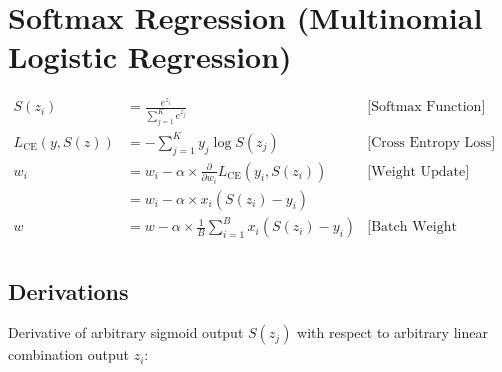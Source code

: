 \section{Softmax Regression (Multinomial Logistic Regression)}

\begin{align*}
    S(z_i) &= \frac{e^{z_i}}{\sum^{K}_{j=1} e^{z_j}} & \text{[Softmax Function]}\\
    L_{\text{CE}}(y, S(z)) &= - \sum^{K}_{j=1} y_j \log S(z_j)& \text{[Cross Entropy Loss]}\\
    w_i &= w_i - \alpha \times \frac{\partial}{\partial w_i} L_{\text{CE}}(y_i, S(z_i))& \text{[Weight Update]}\\
    &= w_i - \alpha \times x_i(S(z_i) - y_i) &\\
    w &= w - \alpha \times \frac{1}{B} \sum^{B}_{i=1}x_i(S(z_i) - y_i) & \text{[Batch Weight Update]}\\
\end{align*}



\subsection{Derivations}
Derivative of arbitrary sigmoid output $S(z_j)$ with respect to arbitrary linear combination output $z_i$:\\ 

